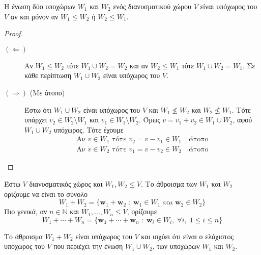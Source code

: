 \begin{prop}
\item {}
    Η ένωση δύο υποχώρων $ W_{1} $ και $ W_{2} $ ενός διανυσματικού χώρου $V$ 
    είναι υπόχωρος του $V$ αν και μόνον αν $ W_{1} \leq W_{2} $ ή $ W_{2} \leq W_{1} $.
\end{prop}
\begin{proof}
\item {}
    \begin{description}
        \item [$(\Leftarrow)$] Αν $ W_{1} \leq W_{2} $ τότε 
            $ W_{1} \cup W_{2} = W_{2} $ και αν $ W_{2} \leq W_{1} $ τότε 
            $ W_{1} \cup W_{2} = W_{1} $. 
            Σε κάθε περίπτωση $ W_{1} \cup W_{2} $ είναι υπόχωρος του $V$.
        \item [$(\Rightarrow)$ (Με άτοπο)]  Έστω ότι $ W_{1} \cup W_{2} $ είναι 
            υπόχωρος του $V$ και $ W_{1} \not \leq W_{2} $ και $ W_{2} \not \leq 
            W_{1}$. Τότε υπάρχει $ v_{2} \in W_{2} \setminus W_{1} $ και $ v_{1} \in 
            W_{1} \setminus W_{2}$. Όμως $ v = v_{1}+v_{2} \in W_{1} \cup W_{2} $, 
            αφού $ W_{1} \cup W_{2} $ υπόχωρος. Τότε έχουμε 
            \begin{align*}
                \text{Αν $v \in W_{1}$ τότε} \; v_{2}=v-v_{1} \in W_{1} 
                \quad \text{άτοπο} \\
                \text{Αν $v \in W_{2}$ τότε} \; v_{1}=v-v_{2} \in W_{2} 
                \quad \text{άτοπο}  
            \end{align*}
    \end{description}
\end{proof}

\begin{dfn}
    Έστω $V$ διανυσματικός χώρος και $ W_{1}, W_{2} \leq V $. Το άθροισμα των 
    $ W_{1} $ και $ W_{2} $ ορίζουμε να είναι το σύνολο 
    \[
        W_{1}+W_{2} = \{ \mathbf{w}_{1}+ \mathbf{w}_{2} \; : \; \mathbf{w}_{1} 
        \in W_{1} \; \text{και} \; \mathbf{w}_{2} \in W_{2} \} 
    \]
    Πιο γενικά, αν $ n \in \mathbb{N} $ και $ W_{1}, \ldots, W_{n} \leq V $, ορίζουμε
    \[
        W_{1}+\cdots +W_{n} = \{ \mathbf{w_{1}}+\cdots + \mathbf{w}_{n} \; : \; 
            \mathbf{w}_{i} \in W_{i}, \; \forall i, \; 1 \leq i \leq n \} 
     \] 
\end{dfn}

\begin{prop}
    Το άθροισμα $ W_{1}+W_{2} $ είναι υπόχωρος του $V$ και ισχύει ότι είναι ο 
    ελάχιστος υπόχωρος του $V$ που περιέχει την ένωση $ W_{1} \cup W_{2} $, των 
    υποχώρων $ W_{1} $ και $ W_{2} $. 
\end{prop}

